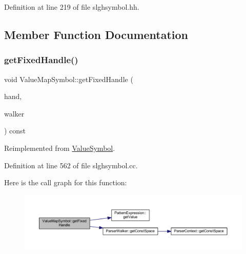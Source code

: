 Definition at line 219 of file slghsymbol.\+hh.



\subsection{Member Function Documentation}
\mbox{\label{class_value_map_symbol_a78aaab9818d7d20cbae621581b99894c}} 
\subsubsection{\texorpdfstring{getFixedHandle()}{getFixedHandle()}}
{\footnotesize\ttfamily void Value\+Map\+Symbol\+::get\+Fixed\+Handle (\begin{DoxyParamCaption}\item[{\mbox{\hyperlink{struct_fixed_handle}{Fixed\+Handle}} \&}]{hand,  }\item[{\mbox{\hyperlink{class_parser_walker}{Parser\+Walker}} \&}]{walker }\end{DoxyParamCaption}) const\hspace{0.3cm}{\ttfamily [virtual]}}



Reimplemented from \mbox{\hyperlink{class_value_symbol_a8eeefeaf224149a7f81a301dc505a705}{Value\+Symbol}}.



Definition at line 562 of file slghsymbol.\+cc.

Here is the call graph for this function\+:
\nopagebreak
\begin{figure}[H]
\begin{center}
\leavevmode
\includegraphics[width=350pt]{class_value_map_symbol_a78aaab9818d7d20cbae621581b99894c_cgraph}
\end{center}
\end{figure}
\mbox{\label{class_value_map_symbol_a5a24c6e3381760dad97f55c929de81f3}} 
